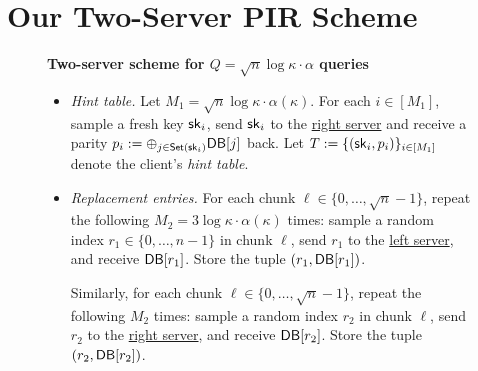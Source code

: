 \section{Our Two-Server PIR Scheme}\label{sec:two-server}

\begin{figure}[p]
    \begin{minipage}{\textwidth}
        \begin{mdframed}
            \label{alg:one-query-ppwps-two}
            \begin{center}
                {\bf Two-server scheme for $Q = \sqrt{n} \log \kappa \cdot \alpha$ queries}
            \end{center}

            \begin{itemize}[leftmargin=3mm,itemsep=1pt,topsep=1pt]
                
                
                \item 
{\it Hint table.}
Let $M_1=\sqrt{n}\log \kappa \cdot \alpha(\kappa)$. For each $i\in [M_1]$, 
sample a fresh \ppps key $\mathsf{sk}_i$, 
send $\mathsf{sk}_i$ 
to the \underline{right server} 
and receive a parity $p_i := \oplus_{j \in \mathsf{Set}(\mathsf{sk}_i)} \mathsf{DB}[j]$ back. 
Let $T := \{({\sf sk}_i, p_i )\}_{i \in
                [M_1]}$ denote the client's {\it hint table}.
                \item 
{\it Replacement entries.}
For each chunk $\ell \in \{0,\ldots,\sqrt{n}-1\}$,
repeat the following 
$M_2=3\log \kappa \cdot \alpha(\kappa)$  times:
sample a random index $r_1 \in \{0, \ldots, n-1\}$ in chunk $\ell$, 
send $r_1$ to the \underline{left server}, and receive $\mathsf{DB}[r_1]$.
Store the tuple $(r_1,\mathsf{DB}[r_1])$. 

Similarly, 
for each chunk $\ell \in \{0,\ldots,\sqrt{n}-1\}$,
repeat the following $M_2$  times:
sample a random index $r_2$ in chunk $\ell$, 
send $r_2$ to the \underline{right server}, and receive $\mathsf{DB}[r_2]$.
Store the tuple $(r_2,\mathsf{DB}[r_2])$. 
            \end{itemize}



\end{mdframed}
\end{minipage}
\end{figure}
